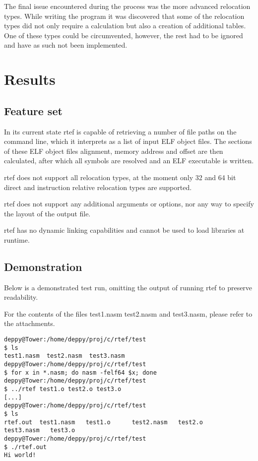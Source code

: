 \documentclass{article}
\begin{document}
The final issue encountered during the process was the more advanced relocation types. While writing the program it was discovered that some of the relocation types did not only require a calculation but also a creation of additional tables. One of these types could be circumvented, however, the rest had to be ignored and have as such not been implemented.

\section{Results}

\subsection{Feature set}

In its current state rtef is capable of retrieving a number of file paths on the command line, which it interprets as a list of input ELF object files. The sections of these ELF object files alignment, memory address and offset are then calculated, after which all symbols are resolved and an ELF executable is written.

rtef does not support all relocation types, at the moment only 32 and 64 bit direct and instruction relative relocation types are supported.

rtef does not support any additional arguments or options, nor any way to specify the layout of the output file.

rtef has no dynamic linking capabilities and cannot be used to load libraries at runtime.

\subsection{Demonstration}

Below is a demonstrated test run, omitting the output of running rtef to preserve readability.

For the contents of the files test1.nasm test2.nasm and test3.nasm, please refer to the attachments.

\begin{verbatim}
deppy@Tower:/home/deppy/proj/c/rtef/test
$ ls
test1.nasm  test2.nasm  test3.nasm
deppy@Tower:/home/deppy/proj/c/rtef/test
$ for x in *.nasm; do nasm -felf64 $x; done
deppy@Tower:/home/deppy/proj/c/rtef/test
$ ../rtef test1.o test2.o test3.o
[...]
deppy@Tower:/home/deppy/proj/c/rtef/test
$ ls
rtef.out  test1.nasm   test1.o      test2.nasm   test2.o      test3.nasm   test3.o
deppy@Tower:/home/deppy/proj/c/rtef/test
$ ./rtef.out
Hi world!
\end{verbatim}
\end{document}
